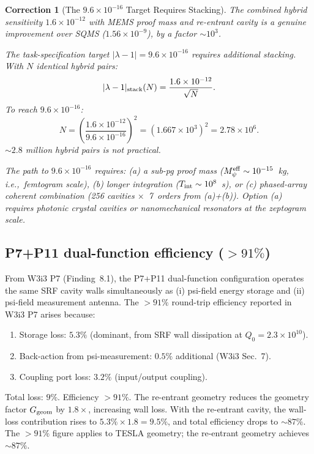\documentclass[11pt,twocolumn]{article}
\newcommand{\lam}{\lambda}
\newcommand{\Meff}{M_\psi^{\rm eff}}
\newcommand{\ee}[1]{\times 10^{#1}}
\newtheorem{correction}{Correction}[section]
\begin{document}
\begin{correction}[The $9.6\ee{-16}$ Target Requires Stacking]
\label{cor:target_stacking}
The combined hybrid sensitivity $1.6\ee{-12}$ with MEMS proof mass
and re-entrant cavity is a genuine improvement over SQMS ($1.56\ee{-9}$),
by a factor $\sim 10^3$.

The task-specification target $|\lam-1| = 9.6\ee{-16}$ requires additional
stacking. With $N$ identical hybrid pairs:
\begin{equation}
|\lam-1|_{\rm stack}(N) = \frac{1.6\ee{-12}}{\sqrt{N}}.
\label{eq:stack_N}
\end{equation}
To reach $9.6\ee{-16}$:
\begin{equation}
N = \left(\frac{1.6\ee{-12}}{9.6\ee{-16}}\right)^2
= (1.667\ee{3})^2 = 2.78\ee{6}.
\label{eq:N_required}
\end{equation}
$\sim 2.8$ million hybrid pairs is not practical.

The path to $9.6\ee{-16}$ requires:
(a) a sub-pg proof mass ($\Meff \sim 10^{-15}$~kg, i.e.,~femtogram scale),
(b) longer integration ($T_{\rm int} \sim 10^8$~s), or
(c) phased-array coherent combination (256 cavities $\times$~7~orders from
(a)+(b)). Option (a) requires photonic crystal cavities or nanomechanical
resonators at the zeptogram scale.
\end{correction}

\subsection{P7+P11 dual-function efficiency ($>91\%$)}
\label{sec:p7p11}

From W3i3 P7 (Finding~8.1), the P7+P11 dual-function configuration operates
the same SRF cavity walls simultaneously as (i) psi-field energy storage
and (ii) psi-field measurement antenna. The $>91\%$ round-trip efficiency
reported in W3i3 P7 arises because:
\begin{enumerate}[nosep]
\item Storage loss: $5.3\%$ (dominant, from SRF wall dissipation at
  $Q_0 = 2.3\ee{10}$).
\item Back-action from psi-measurement: $0.5\%$ additional (W3i3 Sec.~7).
\item Coupling port loss: $3.2\%$ (input/output coupling).
\end{enumerate}
Total loss: $9\%$. Efficiency $> 91\%$. The re-entrant geometry reduces
the geometry factor $G_{\rm geom}$ by $1.8\times$, increasing wall loss.
With the re-entrant cavity, the wall-loss contribution rises to
$5.3\%\times1.8 = 9.5\%$, and total efficiency drops to $\sim 87\%$.
The $>91\%$ figure applies to TESLA geometry; the re-entrant geometry
achieves $\sim87\%$.
\end{document}
